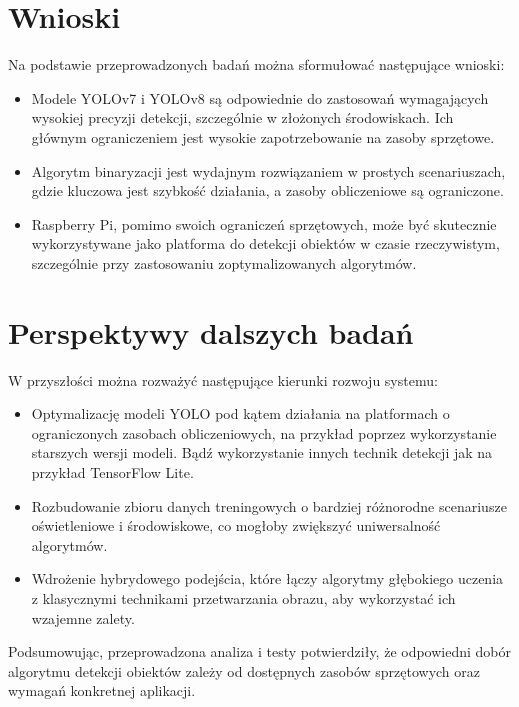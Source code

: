 \documentclass[a4paper,twoside,12pt]{book}
\begin{document}
\section{Wnioski}
Na podstawie przeprowadzonych badań można sformułować następujące wnioski:
\begin{itemize}
    \item Modele YOLOv7 i YOLOv8 są odpowiednie do zastosowań wymagających wysokiej precyzji detekcji, szczególnie w złożonych środowiskach. Ich głównym ograniczeniem jest wysokie zapotrzebowanie na zasoby sprzętowe.
    \item Algorytm binaryzacji jest wydajnym rozwiązaniem w prostych scenariuszach, gdzie kluczowa jest szybkość działania, a zasoby obliczeniowe są ograniczone.
    \item Raspberry Pi, pomimo swoich ograniczeń sprzętowych, może być skutecznie wykorzystywane jako platforma do detekcji obiektów w czasie rzeczywistym, szczególnie przy zastosowaniu zoptymalizowanych algorytmów.
\end{itemize}

\section{Perspektywy dalszych badań}
W przyszłości można rozważyć następujące kierunki rozwoju systemu:
\begin{itemize}
    \item Optymalizację modeli YOLO pod kątem działania na platformach o ograniczonych zasobach obliczeniowych, na przykład poprzez wykorzystanie starszych wersji modeli. Bądź wykorzystanie innych technik detekcji jak na przykład TensorFlow Lite.
    \item Rozbudowanie zbioru danych treningowych o bardziej różnorodne scenariusze oświetleniowe i środowiskowe, co mogłoby zwiększyć uniwersalność algorytmów.
    \item Wdrożenie hybrydowego podejścia, które łączy algorytmy głębokiego uczenia z klasycznymi technikami przetwarzania obrazu, aby wykorzystać ich wzajemne zalety.
\end{itemize}

Podsumowując, przeprowadzona analiza i testy potwierdziły, że odpowiedni dobór algorytmu detekcji obiektów zależy od dostępnych zasobów sprzętowych oraz wymagań konkretnej aplikacji.







\backmatter
\end{document}
